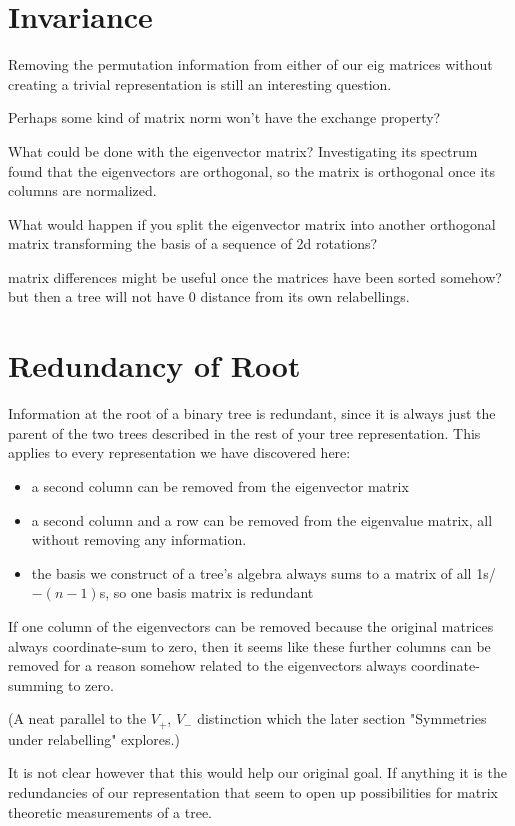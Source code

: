 \documentclass[10pt,a4paper]{report}
\begin{document}
\section{Invariance}

Removing the permutation information from either of our eig matrices without
creating a trivial representation is still an interesting question.

Perhaps some kind of matrix norm won't have the exchange property?

What could be done with the eigenvector matrix? Investigating its spectrum
found that the eigenvectors are orthogonal, so the matrix is orthogonal once
its columns are normalized.

What would happen if you split the eigenvector matrix into another orthogonal
matrix transforming the basis of a sequence of 2d rotations?

matrix differences might be useful once the matrices have been sorted somehow?
but then a tree will not have 0 distance from its own relabellings.

\section{Redundancy of Root}

Information at the root of a binary tree is redundant, since it is always just
the parent of the two trees described in the rest of your tree representation.
This applies to every representation we have discovered here:
\begin{itemize}
	\item a second column can be removed from the eigenvector matrix
	\item a second column and a row can be removed from the eigenvalue matrix,
		all without removing any information.
	\item the basis we construct of a tree's algebra always sums to a matrix of
		all 1s/$-(n-1)$s, so one basis matrix is redundant
\end{itemize}

If one column of the eigenvectors can be removed because the original matrices
always coordinate-sum to zero, then it seems like these further columns can be
removed for a reason somehow related to the eigenvectors always
coordinate-summing to zero.

(A neat parallel to the $V_+$, $V_-$ distinction which the later section
"Symmetries under relabelling" explores.)

It is not clear however that this would help our original goal. If anything it
is the redundancies of our representation that seem to open up possibilities
for matrix theoretic measurements of a tree.
\end{document}
